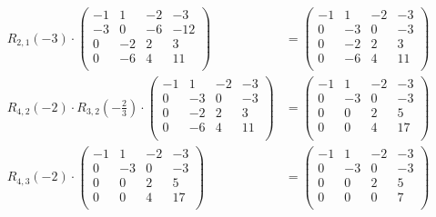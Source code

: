 \documentclass{article}
\begin{document}
\begin{align*}
    R_{2,1}(-3) \cdot 
    \begin{pmatrix}
        -1 & 1 & -2 & -3 \\
        -3 & 0 & -6 & -12 \\
        0 & -2 & 2 & 3 \\
        0 & -6 & 4 & 11 \\
    \end{pmatrix}
    &=
    \begin{pmatrix}
        -1 & 1 & -2 & -3 \\
        0 & -3 & 0 & -3 \\
        0 & -2 & 2 & 3 \\
        0 & -6 & 4 & 11 \\
    \end{pmatrix} \\
    R_{4,2}(-2) \cdot R_{3,2}\left(-\frac{2}{3}\right) \cdot \begin{pmatrix}
        -1 & 1 & -2 & -3 \\
        0 & -3 & 0 & -3 \\
        0 & -2 & 2 & 3 \\
        0 & -6 & 4 & 11 \\
    \end{pmatrix} &= \begin{pmatrix}
        -1 & 1 & -2 & -3 \\
        0 & -3 & 0 & -3 \\
        0 & 0 & 2 & 5 \\
        0 & 0 & 4 & 17 \\
    \end{pmatrix} \\
    R_{4,3}(-2) \cdot \begin{pmatrix}
        -1 & 1 & -2 & -3 \\
        0 & -3 & 0 & -3 \\
        0 & 0 & 2 & 5 \\
        0 & 0 & 4 & 17 \\
    \end{pmatrix}
    &=
    \begin{pmatrix}
        -1 & 1 & -2 & -3 \\
        0 & -3 & 0 & -3 \\
        0 & 0 & 2 & 5 \\
        0 & 0 & 0 & 7 \\
    \end{pmatrix}
\end{align*}
\end{document}
